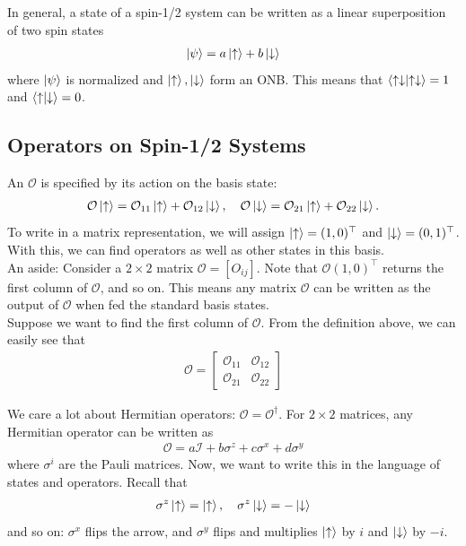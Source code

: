 \documentclass{book}
\theoremstyle{definition}
\newcommand{\Id}{\mathcal{I}}
\begin{document}
In general, a state of a spin-1/2 system  can be written as a linear superposition of two spin states
\begin{align}
\ket{\psi} = a\ket{\uparrow} + b\ket{\downarrow}
\end{align}
where $\ket{\psi}$ is normalized and $\ket{\uparrow},\ket{\downarrow}$ form an ONB. This means that $\braket{\uparrow\downarrow} = 1$ and $\braket{\uparrow}{\downarrow} = 0$. 

\subsection{Operators on Spin-1/2 Systems}
An $\mathcal{O}$ is specified by its action on the basis state: 
\begin{align}
\mathcal{O}\ket{\uparrow} = \mathcal{O}_{11}\ket{\uparrow} + \mathcal{O}_{12}\ket{\downarrow},\quad \mathcal{O}\ket{\downarrow} = \mathcal{O}_{21}\ket{\uparrow} + \mathcal{O}_{22}\ket{\downarrow}.
\end{align}
To write in a matrix representation, we will assign $\ket{\uparrow} = (1,0)^\top$ and $\ket{\downarrow} = (0,1)^\top$. With this, we can find operators as well as other states in this basis.\\

An aside: Consider a $2\times 2$ matrix $\mathcal{O} = [O_{ij}]$. Note that $\mathcal{O}(1,0)^\top$ returns the first column of $\mathcal{O}$, and so on. This means any matrix $\mathcal{O}$ can be written as the output of $\mathcal{O}$ when fed the standard basis states. \\

Suppose we want to find the first column of $\mathcal{O}$. From the definition above, we can easily see that
\begin{align}
\mathcal{O} = \begin{bmatrix}
\mathcal{O}_{11} & \mathcal{O}_{12} \\ \mathcal{O}_{21} & \mathcal{O}_{22}
\end{bmatrix}
\end{align}


We care a lot about Hermitian operators: $\mathcal{O} = \mathcal{O}^\dagger$. For $2\times 2$ matrices, any Hermitian operator can be written as 
\begin{align}
\mathcal{O} = a\Id + b\sigma^z + c\sigma^x + d\sigma^y
\end{align}
where $\sigma^i$ are the Pauli matrices. Now, we want to write this in the language of states and operators. Recall that 
\begin{align}
\sigma^z\ket{\uparrow} = \ket{\uparrow}, \quad \sigma^z\ket{\downarrow} = -\ket{\downarrow}
\end{align}
and so on: $\sigma^x$ flips the arrow, and $\sigma^y$ flips and multiplies $\ket{\uparrow}$ by $i$ and $\ket{\downarrow}$ by $-i$. \\
\end{document}
